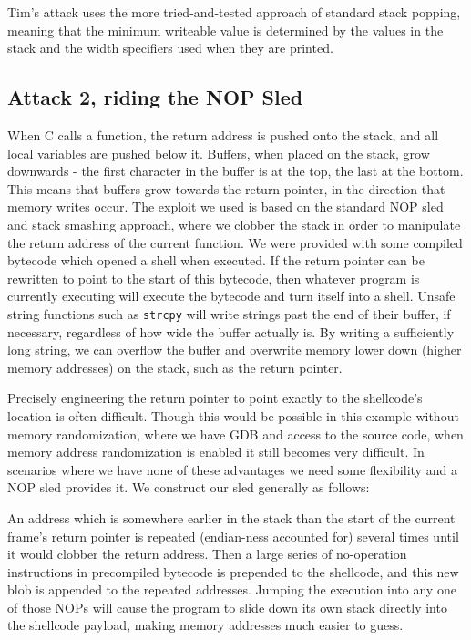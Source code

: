 Tim's attack uses the more tried-and-tested approach of standard stack popping, meaning that the minimum writeable value
is determined by the values in the stack and the width specifiers used when they are printed.

\subsection{Attack 2, riding the NOP Sled}

When C calls a function, the return address is pushed onto the stack, and all local variables are pushed below it.
Buffers, when placed on the stack, grow downwards - the first character in the buffer is at the top, the last at the
bottom. This means that buffers grow towards the return pointer, in the direction that memory writes occur. The exploit
we used is based on the standard NOP sled and stack smashing approach, where we clobber the stack in order to manipulate
the return address of the current function. We were provided with some compiled bytecode which opened a shell when
executed. If the return pointer can be rewritten to point to the start of this bytecode, then whatever program is
currently executing will execute the bytecode and turn itself into a shell. Unsafe string functions such as {\tt strcpy}
will write strings past the end of their buffer, if necessary, regardless of how wide the buffer actually is. By writing
a sufficiently long string, we can overflow the buffer and overwrite memory lower down (higher memory addresses) on the
stack, such as the return pointer.

Precisely engineering the return pointer to point exactly to the shellcode's location is often difficult. Though this
would be possible in this example without memory randomization, where we have GDB and access to the source code, when
memory address randomization is enabled it still becomes very difficult. In scenarios where we have none of these
advantages we need some flexibility and a NOP sled provides it. We construct our sled generally as follows:

An address which is somewhere earlier in the stack than the start of the current frame's return pointer is repeated
(endian-ness accounted for) several times until it would clobber the return address. Then a large series of no-operation
instructions in precompiled bytecode is prepended to the shellcode, and this new blob is appended to the repeated
addresses. Jumping the execution into any one of those NOPs will cause the program to slide down its own stack directly
into the shellcode payload, making memory addresses much easier to guess.

